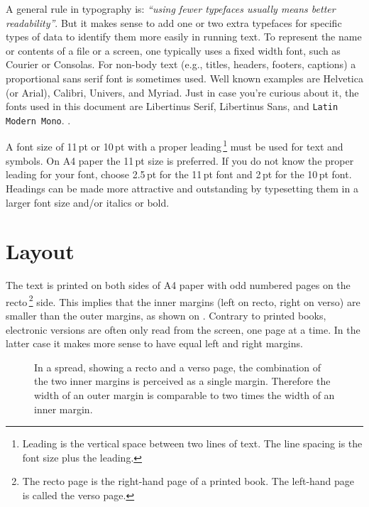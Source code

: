 \documentclass[11pt,article,oneside,british,extralanguage=dutch]{kulemt}
\newcommand*\rmfontname{Libertinus Serif}
\newcommand*\sffontname{Libertinus Sans}
\newcommand*\ttfontname{Latin Modern Mono}%
\newcommand*\ttfontname{Latin Modern Typewriter}%
\begin{document}
A general rule in typography is: \emph{``using fewer typefaces usually means
  better readability''}. But it makes sense to add one or two extra
typefaces for specific types of data to identify them more easily in
running text. To represent the name or contents of a file or a screen, one
typically uses a fixed width font, such as Courier or Consolas. For
non-body text (e.g., titles, headers, footers, captions) a proportional
sans serif font is sometimes used. Well known examples are Helvetica (or
Arial), Calibri, Univers, and Myriad. Just in case you're curious about it,
the fonts used in this document are \rmfontname, \textsf{\sffontname}, and
\texttt{\ttfontname}.
.

A font size of 11\,pt or 10\,pt with a proper leading\,\footnote{Leading is
  the vertical space between two lines of text. The line spacing is the
  font size plus the leading.} must be used for text and symbols. On A4
paper the 11\,pt size is preferred. If you do not know the proper leading
for your font, choose 2.5\,pt for the 11\,pt font and 2\,pt for the 10\,pt
font. Headings can be made more attractive and outstanding by typesetting
them in a larger font size and/or italics or bold.

\section{Layout}
The text is printed on both sides of A4 paper with odd numbered pages on the
recto\,\footnote{The recto page is the right-hand page of a printed book. The
  left-hand page is called the verso page.} side. This implies that the inner
margins (left on recto, right on verso) are smaller than the outer margins, as
shown on . Contrary to printed books, electronic versions are
often only read from the screen, one page at a time. In the latter case it
makes more sense to have equal left and right margins.

\begin{figure}
  \centering
  \begin{minipage}[b]{0.5\textwidth}
  \end{minipage}
  \caption{In a spread, showing a recto and a verso page, the combination of
    the two inner margins is perceived as a single margin. Therefore the width
    of an outer margin is comparable to two times the width of an inner
    margin.}
  \label{fig:spread}
\end{figure}
\end{document}
